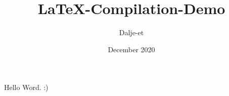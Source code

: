 \documentclass{article}
\title{LaTeX-Compilation-Demo}
\author{Dalje-et}
\date{December 2020}
\begin{document}
\maketitle

Hello Word. :)
\end{document}
